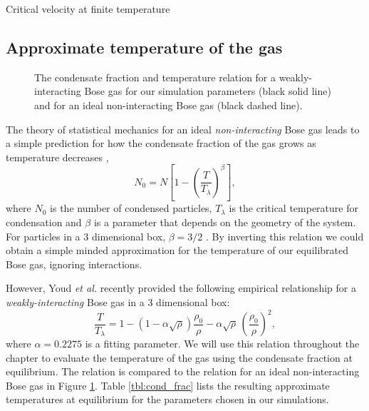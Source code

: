 \begin{chapter}{\label{cha:nonequib}Critical velocity at finite temperature}
\subsection{Approximate temperature of the gas}
\begin{figure}
\begin{center}
%
\end{center}
\caption{\label{fig:cfvst}The condensate fraction and temperature relation for a weakly-interacting Bose gas for our simulation parameters (black solid line) and for an ideal non-interacting Bose gas (black dashed line).}
\end{figure} 

The theory of statistical mechanics for an ideal {\it non-interacting} Bose gas leads to a simple prediction for how the condensate fraction of the gas grows as temperature decreases \cite{Pethick},
\begin{equation}
N_0 = N \left [ 1-\left ( \frac{T}{T_\lambda} \right )^\beta \right ],
\end{equation}
where $N_0$ is the number of condensed particles, $T_{\lambda}$ is the critical temperature for condensation and $\beta$ is a parameter that depends on the geometry of the system. For particles in a 3 dimensional box, $\beta=3/2$ \cite{Pethick}. By inverting this relation we could obtain a simple minded approximation for the temperature of our equilibrated Bose gas, ignoring interactions.

However, Youd {\it et al.} \cite{berloff_2007} recently provided the following empirical relationship for a {\it weakly-interacting} Bose gas in a 3 dimensional box:
\begin{equation}
  \frac{T}{T_\lambda} = 1 - (1 - \alpha\sqrt{\rho})\frac{\rho_0}{\rho} - \alpha\sqrt{\rho}\,\left(\frac{\rho_0}{\rho}\right)^2,
  \label{eq:temp}
\end{equation}
where $\alpha=0.2275$ is a fitting parameter. We will use this relation throughout the chapter to evaluate the temperature of the gas using the condensate fraction at equilibrium. The relation is compared to the relation for an ideal non-interacting Bose gas in Figure \ref{fig:cfvst}. Table \ref{tbl:cond_frac} lists the resulting approximate temperatures at equilibrium for the parameters chosen in our simulations.


\end{chapter}
